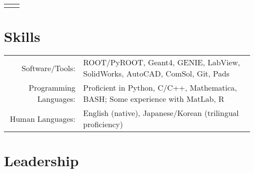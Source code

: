 \documentclass[11pt]{article} %
\begin{document}
\begin{tabularx}{\linewidth}{@{}lR@{}}
{\begin{minipage}[t]{\linewidth}
\begin{itemize}
		\end{itemize}
	\end{minipage}}\\
\end{tabularx}


\section{Skills}

\noindent\begin{tabularx}{\linewidth}{@{}rl}
	Software/Tools: & ROOT/PyROOT, Geant4, GENIE, LabView, SolidWorks, AutoCAD,
	ComSol, Git, Pads\\
	Programming Languages: & Proficient in Python, C/C++, Mathematica, BASH;
	Some experience with MatLab, R\\
	Human Languages: & English (native), Japanese/Korean (trilingual proficiency)\\
\end{tabularx}


\section{Leadership}
\end{document}
